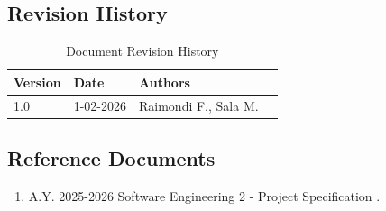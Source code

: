 \subsection{Revision History}
\begin{table}[H]
\centering
\begin{tabular}{|l|l|l|l|}
\hline
\textbf{Version} & \textbf{Date} & \textbf{Authors} \\
\hline
1.0 & 1-02-2026 & Raimondi F., Sala M. \\
\hline
\end{tabular}
\caption{Document Revision History}
\end{table}

\subsection{Reference Documents}
\begin{enumerate}
    \item A.Y. 2025-2026 Software Engineering 2 - Project Specification \cite{project_spec} \cite{project_spec2}.
\end{enumerate}

